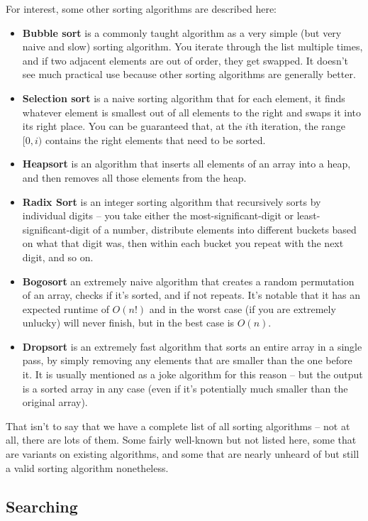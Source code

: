 For interest, some other sorting algorithms are described here:
\begin{itemize}
\item \textbf{Bubble sort} is a commonly taught algorithm as a very simple (but very naive and slow) sorting algorithm. You iterate through the list multiple times, and if two adjacent elements are out of order, they get swapped. It doesn't see much practical use because other sorting algorithms are generally better.
\item \textbf{Selection sort} is a naive sorting algorithm that for each element, it finds whatever element is smallest out of all elements to the right and swaps it into its right place. You can be guaranteed that, at the $i$th iteration, the range $[0,i)$ contains the right elements that need to be sorted.
\item \textbf{Heapsort} is an algorithm that inserts all elements of an array into a heap, and then removes all those elements from the heap.
\item \textbf{Radix Sort} is an integer sorting algorithm that recursively sorts by individual digits -- you take either the most-significant-digit or least-significant-digit of a number, distribute elements into different buckets based on what that digit was, then within each bucket you repeat with the next digit, and so on.
\item \textbf{Bogosort} an extremely naive algorithm that creates a random permutation of an array, checks if it's sorted, and if not repeats. It's notable that it has an expected runtime of $O(n!)$ and in the worst case (if you are extremely unlucky) will never finish, but in the best case is $O(n)$.
\item \textbf{Dropsort} is an extremely fast algorithm that sorts an entire array in a single pass, by simply removing any elements that are smaller than the one before it. It is usually mentioned as a joke algorithm for this reason -- but the output is a sorted array in any case (even if it's potentially much smaller than the original array).
\end{itemize}

That isn't to say that we have a complete list of all sorting algorithms -- not at all, there are lots of them. Some fairly well-known but not listed here, some that are variants on existing algorithms, and some that are nearly unheard of but still a valid sorting algorithm nonetheless.

\subsection{Searching}

